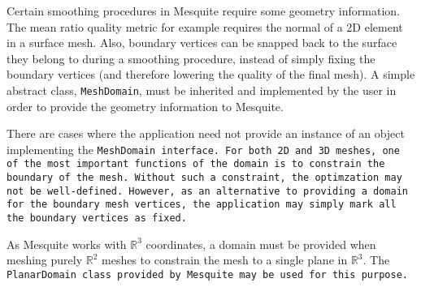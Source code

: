 Certain smoothing procedures in Mesquite require some geometry information. The mean ratio quality
metric for example requires the normal of a 2D element in a surface mesh. Also, boundary
vertices can be snapped back to the surface they belong to during a smoothing procedure, instead of
simply fixing the boundary vertices (and therefore lowering the quality of the final mesh). A simple abstract
class, \texttt{MeshDomain}, must be inherited and implemented by the user in order to provide the
geometry information to Mesquite.  

There are cases where the application need not provide an instance of an
object implementing the \tt{MeshDomain} interface.  For both 2D and 3D meshes,
one of the most important functions of the domain is to constrain the boundary
of the mesh.  Without such a constraint, the optimzation may not be well-defined.  However, as an alternative to providing a domain for the boundary
mesh vertices, the application may simply mark all the boundary vertices as 
fixed.  

As Mesquite works with $\mathbb{R}^{3}$ coordinates, a domain must be provided
when meshing purely $\mathbb{R}^{2}$ meshes to constrain the mesh to a single plane in $\mathbb{R}^{3}$.  The \tt{PlanarDomain} class provided by Mesquite may be 
used for this purpose.
